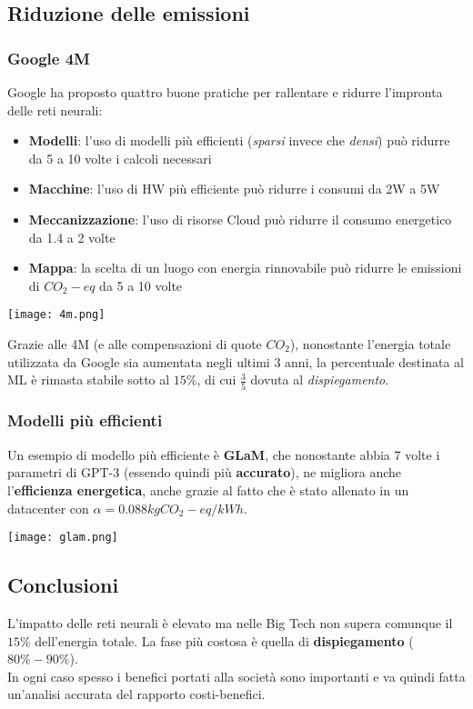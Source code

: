 \subsection{Riduzione delle emissioni}
\subsubsection{Google 4M}
Google ha proposto quattro buone pratiche per rallentare e ridurre l'impronta delle reti neurali:
\begin{itemize}
	\item \textbf{Modelli}: l'uso di modelli più efficienti (\textit{sparsi} invece che \textit{densi})	può ridurre da 5 a 10 volte i calcoli necessari
	\item \textbf{Macchine}: l'uso di HW più efficiente può ridurre i consumi da 2W a 5W
	\item \textbf{Meccanizzazione}: l'uso di risorse Cloud può ridurre il consumo energetico da 1.4 a 2 volte
	\item \textbf{Mappa}: la scelta di un luogo con energia rinnovabile può ridurre le emissioni di $CO_2-eq$ da 5 a 10 volte
\end{itemize}
\begin{center}
	\texttt{[image: 4m.png]}
\end{center}
Grazie alle 4M (e alle compensazioni di quote $CO_2$), nonostante l'energia totale utilizzata da Google sia aumentata negli ultimi 3 anni, la percentuale destinata al ML è rimasta stabile sotto al $15\%$, di cui $\frac{3}{5}$ dovuta al \textit{dispiegamento}.
\subsubsection{Modelli più efficienti}
Un esempio di modello più efficiente è \color{green}\textbf{GLaM}\color{black}, che nonostante abbia 7 volte i parametri di \color{red}GPT-3 \color{black} (essendo quindi più \textbf{accurato}), ne migliora anche l'\textbf{efficienza energetica}, anche grazie al fatto che è stato allenato in un datacenter con $\alpha=0.088 kgCO_2-eq/kWh$.
\begin{center}
	\texttt{[image: glam.png]}
\end{center}
\subsection{Conclusioni}
L'impatto delle reti neurali è elevato ma nelle Big Tech non supera comunque il $15\%$ dell'energia totale. La fase più costosa è quella di \textbf{dispiegamento} ($80\%-90\%$).\\
In ogni caso spesso i benefici portati alla società sono importanti e va quindi fatta un'analisi accurata del rapporto costi-benefici.